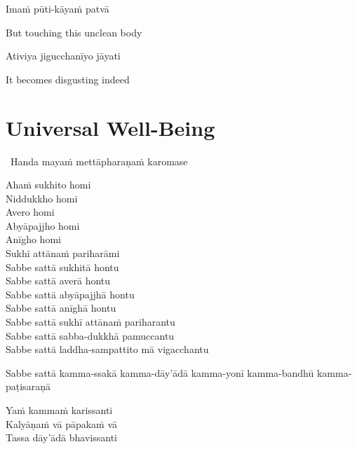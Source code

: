 Imaṁ pūti-kāyaṁ patvā

\begin{english}
  But touching this unclean body
\end{english}

Ativiya jigucchanīyo jāyati

\begin{english}
  It becomes disgusting indeed
\end{english}

\suttaRef{[Trad]}




\section{Universal Well-Being}
\label{universal-well-being}

\begin{leader}
  \anglebracketleft\ \hspace{-0.5mm}Handa mayaṁ mettāpharaṇaṁ karomase \hspace{-0.5mm}\anglebracketright\
\end{leader}

Ahaṁ sukhito homi\\
Niddukkho homi\\
Avero homi\\
Abyāpajjho homi\\
Anīgho homi\\
Sukhī attānaṁ pariharāmi\\
Sabbe sattā sukhitā hontu\\
Sabbe sattā averā hontu\\
Sabbe sattā abyāpajjhā hontu\\
Sabbe sattā anīghā hontu\\
Sabbe sattā sukhī attānaṁ pariharantu\\
Sabbe sattā sabba-dukkhā pamuccantu\\
Sabbe sattā laddha-sampattito mā vigacchantu

\bigskip

\begin{pali-hangtogether}
  Sabbe sattā kamma-ssakā kamma-dāy'ādā kamma-yonī kamma-bandhū kamma-paṭisaraṇā\\
\end{pali-hangtogether}
Yaṁ kammaṁ karissanti\\
Kalyāṇaṁ vā pāpakaṁ vā\\
Tassa dāy'ādā bhavissanti

